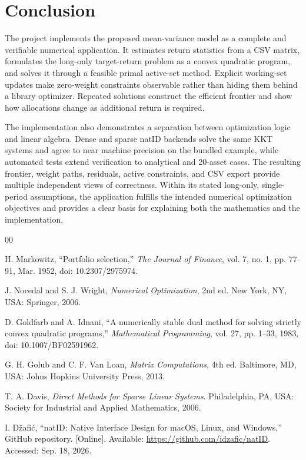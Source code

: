 \documentclass[conference]{IEEEtran}
\begin{document}
\section{Conclusion}

The project implements the proposed mean-variance model as a complete and
verifiable numerical application. It estimates return statistics from a CSV
matrix, formulates the long-only target-return problem as a convex quadratic
program, and solves it through a feasible primal active-set method. Explicit
working-set updates make zero-weight constraints observable rather than hiding
them behind a library optimizer. Repeated solutions construct the efficient
frontier and show how allocations change as additional return is required.

The implementation also demonstrates a separation between optimization logic
and linear algebra. Dense and sparse natID backends solve the same KKT systems
and agree to near machine precision on the bundled example, while automated
tests extend verification to analytical and 20-asset cases. The resulting
frontier, weight paths, residuals, active constraints, and CSV export provide
multiple independent views of correctness. Within its stated long-only,
single-period assumptions, the application fulfills the intended numerical
optimization objectives and provides a clear basis for explaining both the
mathematics and the implementation.

\balance
\begin{thebibliography}{00}

H. Markowitz, ``Portfolio selection,'' \emph{The Journal of Finance},
vol. 7, no. 1, pp. 77--91, Mar. 1952, doi: 10.2307/2975974.

J. Nocedal and S. J. Wright, \emph{Numerical Optimization}, 2nd ed.
New York, NY, USA: Springer, 2006.

D. Goldfarb and A. Idnani, ``A numerically stable dual method for solving
strictly convex quadratic programs,'' \emph{Mathematical Programming},
vol. 27, pp. 1--33, 1983, doi: 10.1007/BF02591962.

G. H. Golub and C. F. Van Loan, \emph{Matrix Computations}, 4th ed.
Baltimore, MD, USA: Johns Hopkins University Press, 2013.

T. A. Davis, \emph{Direct Methods for Sparse Linear Systems}.
Philadelphia, PA, USA: Society for Industrial and Applied Mathematics, 2006.

I. D\v{z}afi\'{c}, ``natID: Native Interface Design for macOS, Linux, and
Windows,'' GitHub repository. [Online]. Available:
\url{https://github.com/idzafic/natID}. Accessed: Sep. 18, 2026.

\end{thebibliography}
\end{document}
